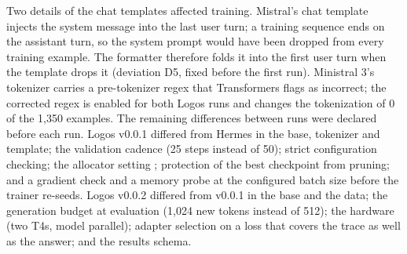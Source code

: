 Two details of the chat templates affected training. Mistral's chat template injects the system message into the last user turn; a training sequence ends on the assistant turn, so the system prompt would have been dropped from every training example. The formatter therefore folds it into the first user turn when the template drops it (deviation D5, fixed before the first run). Ministral 3's tokenizer carries a pre-tokenizer regex that Transformers flags as incorrect; the corrected regex is enabled for both Logos runs and changes the tokenization of 0 of the 1,350 examples. The remaining differences between runs were declared before each run. Logos v0.0.1 differed from Hermes in the base, tokenizer and template; the validation cadence (25 steps instead of 50); strict configuration checking; the allocator setting ; protection of the best checkpoint from pruning; and a gradient check and a memory probe at the configured batch size before the trainer re-seeds. Logos v0.0.2 differed from v0.0.1 in the base and the data; the generation budget at evaluation (1,024 new tokens instead of 512); the hardware (two T4s, model parallel); adapter selection on a loss that covers the trace as well as the answer; and the results schema.

